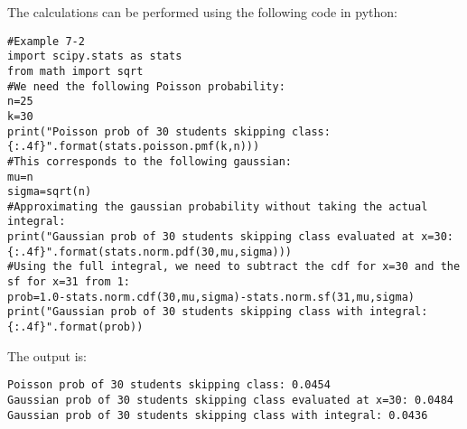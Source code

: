 \begin{example}{}
The calculations can be performed using the following code in python:
\begin{lstlisting}
#Example 7-2
import scipy.stats as stats
from math import sqrt
#We need the following Poisson probability:
n=25
k=30
print("Poisson prob of 30 students skipping class: {:.4f}".format(stats.poisson.pmf(k,n)))
#This corresponds to the following gaussian:
mu=n
sigma=sqrt(n)
#Approximating the gaussian probability without taking the actual integral:
print("Gaussian prob of 30 students skipping class evaluated at x=30: {:.4f}".format(stats.norm.pdf(30,mu,sigma)))
#Using the full integral, we need to subtract the cdf for x=30 and the sf for x=31 from 1:
prob=1.0-stats.norm.cdf(30,mu,sigma)-stats.norm.sf(31,mu,sigma)
print("Gaussian prob of 30 students skipping class with integral: {:.4f}".format(prob))
\end{lstlisting}
The output is:
\begin{verbatim}
Poisson prob of 30 students skipping class: 0.0454
Gaussian prob of 30 students skipping class evaluated at x=30: 0.0484
Gaussian prob of 30 students skipping class with integral: 0.0436
\end{verbatim}

\end{example}

